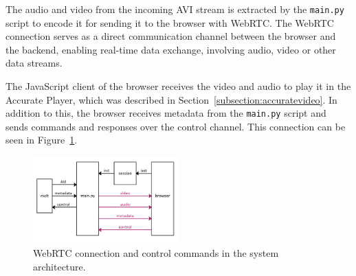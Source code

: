 \documentclass[../MasterThesis.tex]{subfiles}
\begin{document}
The audio and video from the incoming AVI stream is extracted by the \texttt{main.py} script to encode it for sending it to the browser with WebRTC. The WebRTC connection serves as a direct communication channel between the browser and the backend, enabling real-time data exchange, involving audio, video or other data streams. 


%


The JavaScript client of the browser receives the video and audio to play it in the Accurate Player, which was described in Section~\ref{subsection:accuratevideo}. In addition to this, the browser
receives metadata from the \texttt{main.py} script and sends commands and responses over the control channel. This connection can be seen in Figure~\ref{figure:videoaudio}.


\begin{figure}[H]
	\centering
	\includegraphics[width=0.5\textwidth]{IM_wrtc_control.png}
	\caption[WebRTC and control in the system architecture.]{WebRTC connection and control commands in the system architecture.}
	\label{figure:videoaudio}
\end{figure}
\end{document}
